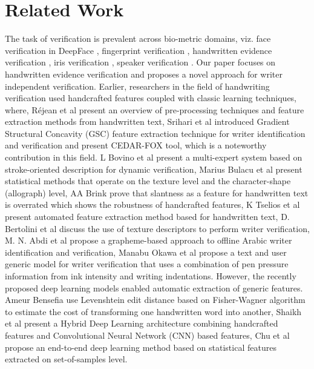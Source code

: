\documentclass[a4paper,conference]{IEEEtran}
\begin{document}
\section{Related Work}
The task of verification is prevalent across bio-metric domains, viz. face verification in DeepFace \cite{taigman_deepface_2014}, fingerprint verification \cite{jain_-line_1997}, handwritten evidence verification \cite{gideon_handwritten_2018}, iris verification \cite{nguyen_iris_2018}, speaker verification \cite{speaker_verification}. Our paper focuses on handwritten evidence verification and proposes a novel approach for writer independent verification.
\newline \indent Earlier, researchers in the field of handwriting verification used handcrafted features coupled with classic learning techniques, where, Réjean et al \cite{PLAMONDON1989107} present an overview of pre-processing techniques and feature extraction methods from handwritten text, Srihari et al introduced Gradient Structural Concavity (GSC) feature extraction technique \cite{srihari_individuality_2001} for writer identification and verification and present CEDAR-FOX tool, which is a noteworthy contribution in this field. L Bovino et al \cite{bovino2003multi} present a multi-expert system based on stroke-oriented description for dynamic verification, Marius Bulacu et al \cite{bulacu_text-independent_2007} present statistical methods that operate on the texture level and the character-shape (allograph) level, AA Brink \cite{brink_towards_2011} prove that slantness as a feature for handwritten text is overrated which shows the robustness of handcrafted features, K Tselios et al \cite{tselios2011automated} present automated feature extraction method  based for handwritten text, D. Bertolini et al\cite{BERTOLINI20132069} discuss the use of texture descriptors to perform writer verification, M. N. Abdi et al\cite{abdi_model-based_2015} propose a grapheme-based approach to offline Arabic writer identification and verification, Manabu Okawa et al\cite{okawa_text_2015} propose a text and user generic model for writer verification that uses a combination of pen pressure information from ink intensity and writing indentations. 
\newline \indent However, the recently proposed deep learning models enabled automatic extraction of generic features. Ameur Bensefia\cite{bensefia_writer_2016} use Levenshtein edit distance based on Fisher-Wagner algorithm to estimate the cost of transforming one handwritten word into another, Shaikh et al\cite{shaikh_hybrid_2018} present a Hybrid Deep Learning architecture combining handcrafted features and Convolutional Neural Network (CNN) based features, Chu et al\cite{chu_writer_2018} propose an end-to-end deep learning method based on statistical features extracted on set-of-samples level.  
\end{document}
